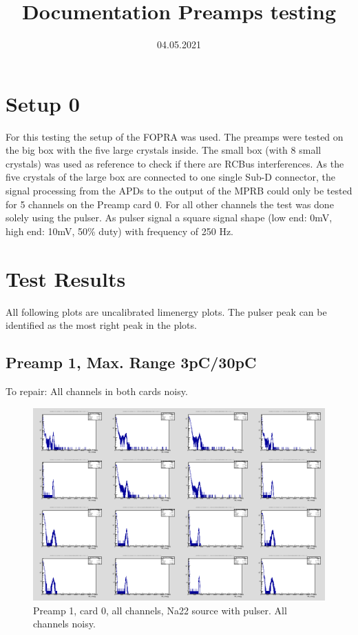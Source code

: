 \documentclass{report}
\title{Documentation Preamps testing}
\date{04.05.2021}
\begin{document}
\maketitle




\section{Setup 0}
For this testing the setup of the FOPRA was used. The preamps were tested on the big box with the five large crystals inside. The small box (with 8 small crystals) was used as reference to check if there are RCBus interferences. As the five crystals of the large box are connected to one single Sub-D connector, the signal processing from the APDs to the output of the MPRB could only be tested for 5 channels on the Preamp card 0. For all other channels the test was done solely using the pulser. As pulser signal a square signal shape (low end: 0mV, high end: 10mV, 50\% duty) with frequency of 250 Hz.


\newpage

\section{Test Results} \label{documentclasses}
All following plots are uncalibrated lim\textunderscore energy plots. The pulser peak can be identified as the most right peak in the plots. 

\subsection{Preamp 1, Max. Range 3pC/30pC}
To repair: All channels in both cards noisy.
\begin{figure}[!htb]
  \includegraphics[width=\linewidth]{preamp1_lim_energy_card0_all.png}
  \caption{Preamp 1, card 0, all channels, Na22 source  with pulser. All channels noisy.}
\end{figure}
\end{document}
